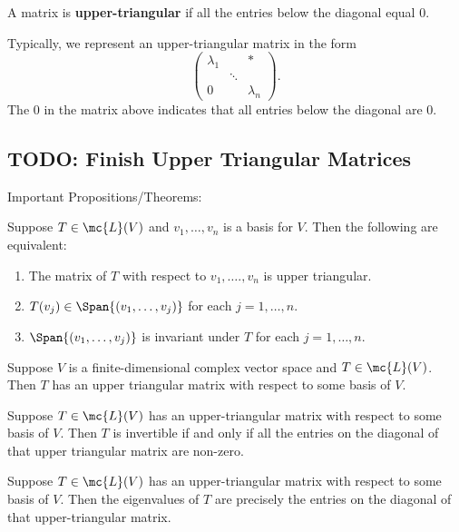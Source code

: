 \documentclass[math0540-lecture-notes.tex]{subfiles}
\begin{document}
\begin{definition}{}
  A matrix is \textbf{upper-triangular} if all the entries below the diagonal equal $0$.
\end{definition}
Typically, we represent an upper-triangular matrix in the form \[
  \begin{pmatrix} \lambda_1& &*\\ & \ddots & \\ 0 & & \lambda_n \end{pmatrix} 
.\]  The $0$ in the matrix above indicates that all entries below the diagonal are $0$.

\subsection{TODO: Finish Upper Triangular Matrices}

Important Propositions/Theorems:
\begin{proposition}{}
  Suppose $T\in \mc{L}(V)$ and $v_1,\ldots,v_n$ is a basis for $V$. Then the following are
  equivalent:
  \begin{enumerate}
    \item The matrix of $T$ with respect to $v_1,\ldots.,v_n$ is upper triangular.
    \item $T(v_j)\in \Span{(v_1,\ldots,v_j)}$ for each $j=1,\ldots,n$.
    \item $\Span{(v_1,\ldots,v_j)}$ is invariant under $T$ for each $j=1,\ldots,n$.
  \end{enumerate}
\end{proposition}

\begin{theorem}{}
  Suppose $V$ is a finite-dimensional complex vector space and $T\in \mc{L}(V)$. Then $T$ has an
  upper triangular matrix with respect to some basis of $V$.
\end{theorem}

\begin{proposition}{}
  Suppose $T\in \mc{L}(V)$ has an upper-triangular matrix with respect to some basis of $V$. Then
  $T$ is invertible if and only if all the entries on the diagonal of that upper triangular matrix
  are non-zero.
\end{proposition}

\begin{proposition}{}
  Suppose $T\in \mc{L}(V)$ has an upper-triangular matrix with respect to some basis of $V$. Then
  the eigenvalues of $T$ are precisely the entries on the diagonal of that upper-triangular matrix.
\end{proposition}
\end{document}
